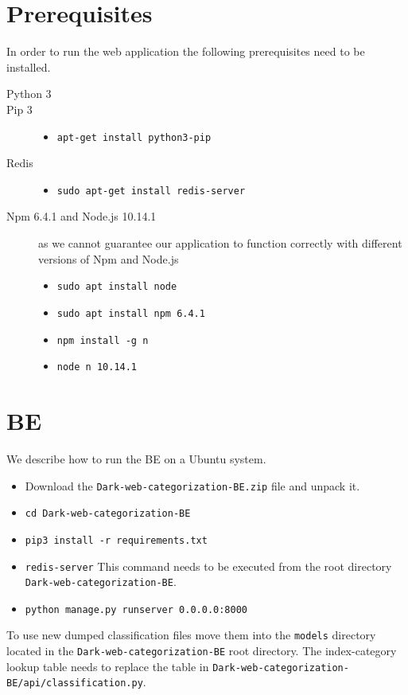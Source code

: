 \begin{appendices}
\section{Prerequisites} \label{dixAppPrerequisites}
In order to run the web application the following prerequisites need to be installed.
\begin{description}
    \item[Python 3] \hfill
    \item[Pip 3] \hfill 
        \begin{itemize}
            \item \texttt{apt-get install python3-pip}
        \end{itemize}
    \item[Redis] \hfill 
        \begin{itemize}
            \item \texttt{sudo apt-get install redis-server}
        \end{itemize}
    \item[Npm 6.4.1 and Node.js 10.14.1] as we cannot guarantee our application to function correctly with different versions of Npm and Node.js
        \begin{itemize}
            \item \texttt{sudo apt install node}
            \item \texttt{sudo apt install npm 6.4.1}
            \item \texttt{npm install -g n}
            \item \texttt{node n 10.14.1}
        \end{itemize}
\end{description}

\section{BE}
We describe how to run the BE on a Ubuntu system.
\begin{itemize}
    \item Download the \texttt{Dark-web-categorization-BE.zip} file and unpack it.
    \item \texttt{cd Dark-web-categorization-BE}
    \item \texttt{pip3 install -r requirements.txt}
    \item \texttt{redis-server} This command needs to be executed from the root directory \texttt{Dark-web-categorization-BE}.
    \item \texttt{python manage.py runserver 0.0.0.0:8000}
\end{itemize}
To use new dumped classification files move them into the \texttt{models} directory located in the \texttt{Dark-web-categorization-BE} root directory. The index-category lookup table needs to replace the table in \texttt{Dark-web-categorization-BE/api/classification.py}.


\end{appendices}
